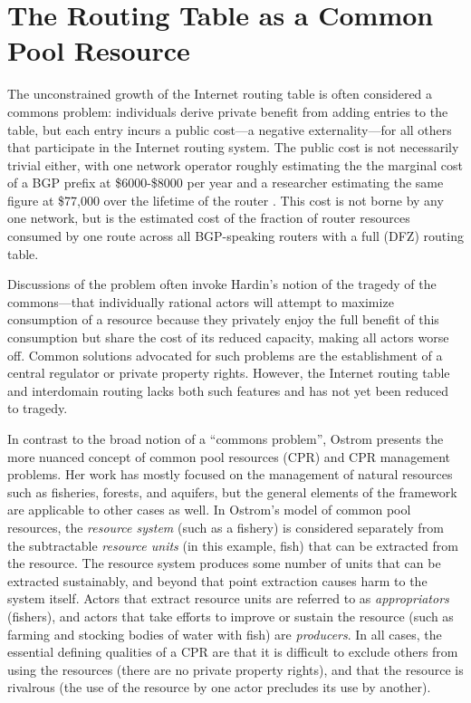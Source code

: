 \section{The Routing Table as a Common Pool Resource}

The unconstrained growth of the Internet routing table is often considered a commons problem: individuals derive private benefit from adding entries to the table, but each entry incurs a public cost---a negative externality---for all others that participate in the Internet routing system. The public cost is not necessarily trivial either, with one network operator roughly estimating the the marginal cost of a BGP prefix at \$6000-\$8000 per year \cite{Herrin:2008qa} and a researcher estimating the same figure at \$77,000 over the lifetime of the router \cite{Clayton:2010bh}. This cost is not borne by any one network, but is the estimated cost of the fraction of router resources consumed by one route across all BGP-speaking routers with a full (DFZ) routing table.

Discussions of the problem \cite{Huston:2001bs,Clayton:2010bh,Bellovin:2001qf} often invoke Hardin's \cite{Hardin:1968uq} notion of the tragedy of the commons---that individually rational actors will attempt to maximize consumption of a resource because they privately enjoy the full benefit of this consumption but share the cost of its reduced capacity, making all actors worse off. Common solutions advocated for such problems are the establishment of a central regulator or private property rights. However, the Internet routing table and interdomain routing lacks both such features and has not yet been reduced to tragedy.

In contrast to the broad notion of a ``commons problem'', Ostrom \cite{Ostrom:1990fv} presents the more nuanced concept of common pool resources (CPR) and CPR management problems. Her work has mostly focused on the management of natural resources such as fisheries, forests, and aquifers, but the general elements of the framework are applicable to other cases as well. In Ostrom's model of common pool resources, the \emph{resource system} (such as a fishery) is considered separately from the subtractable \emph{resource units} (in this example, fish) that can be extracted from the resource. The resource system produces some number of units that can be extracted sustainably, and beyond that point extraction causes harm to the system itself. Actors that extract resource units are referred to as \emph{appropriators} (fishers), and actors that take efforts to improve or sustain the resource (such as farming and stocking bodies of water with fish) are \emph{producers}. In all cases, the essential defining qualities of a CPR are that it is difficult to exclude others from using the resources (there are no private property rights), and that the resource is rivalrous (the use of the resource by one actor precludes its use by another).

